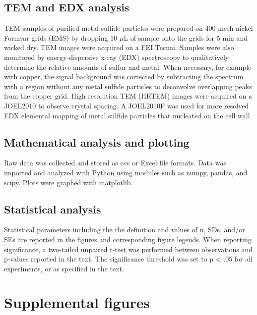 \documentclass[../main/main]{subfiles}
\begin{document}
\subsection*{TEM and EDX analysis}
TEM samples of purified metal sulfide particles were prepared on 400 mesh nickel Formvar grids (EMS) by dropping 10 $\mu$L of sample onto the grids for 5 min and wicked dry. TEM images were acquired on a FEI Tecnai. Samples were also monitored by energy-dispersive x-ray (EDX) spectroscopy to qualitatively determine the relative amounts of sulfur and metal. When necessary, for example with copper, the signal background was corrected by subtracting the spectrum with a region without any metal sulfide particles to deconvolve overlapping peaks from the copper grid. High resolution TEM (HRTEM) images were acquired on a JOEL2010 to observe crystal spacing. A JOEL2010F was used for more resolved EDX elemental mapping of metal sulfide particles that nucleated on the cell wall.

\subsection*{Mathematical analysis and plotting}
Raw data was collected and stored as csv or Excel file formats. Data was imported and analyzed with Python using modules such as numpy, pandas, and scipy. Plots were graphed with matplotlib.

\subsection*{Statistical analysis}
Statistical parameters including the the definition and values of n, SDs, and/or SEs are reported in the figures and corresponding figure legends. When reporting significance, a two-tailed unpaired t-test was performed between observations and p-values reported in the text. The significance threshold was set to p < .05 for all experiments, or as specified in the text.

\clearpage
\section{Supplemental figures}
\renewcommand{\figurename}{S.Figure}
\setcounter{figure}{0}
\end{document}
